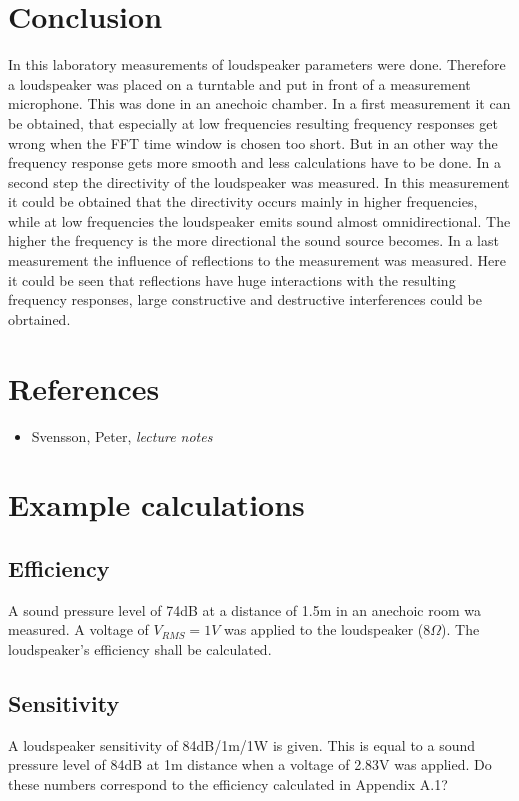 \documentclass{article}
\begin{document}
\section{Conclusion}
In this laboratory measurements of loudspeaker parameters were done. Therefore a loudspeaker was placed on a turntable and put in front of a measurement microphone. This was done in an anechoic chamber. In a first measurement it can be obtained, that especially at low frequencies resulting frequency responses get wrong when the FFT time window is chosen too short. But in an other way the frequency response gets more smooth and less calculations have to be done. In a second step the directivity of the loudspeaker was measured. In this measurement it could be obtained that the directivity occurs mainly in higher frequencies, while at low frequencies the loudspeaker emits sound almost omnidirectional. The higher the frequency is the more directional the sound source becomes. In a last measurement the influence of reflections to the measurement was measured. Here it could be seen that reflections have huge interactions with the resulting frequency responses, large constructive and destructive interferences could be obrtained.

\newpage
\section*{References}
\footnotesize{
\begin{itemize}
\item Svensson, Peter, \textit{lecture notes}
\end{itemize}
}

\newpage
\appendix
\section{Example calculations}
\subsection{Efficiency}
A sound pressure level of 74dB at a distance of 1.5m in an anechoic room wa measured. A voltage of $V_{RMS}=1V$ was applied to the loudspeaker ($8\Omega$). The loudspeaker's efficiency shall be calculated.
\subsection{Sensitivity}
A loudspeaker sensitivity of 84dB/1m/1W is given. This is equal to a sound pressure level of 84dB at 1m distance when a voltage of 2.83V was applied. Do these numbers correspond to the efficiency calculated in Appendix A.1?
\end{document}
